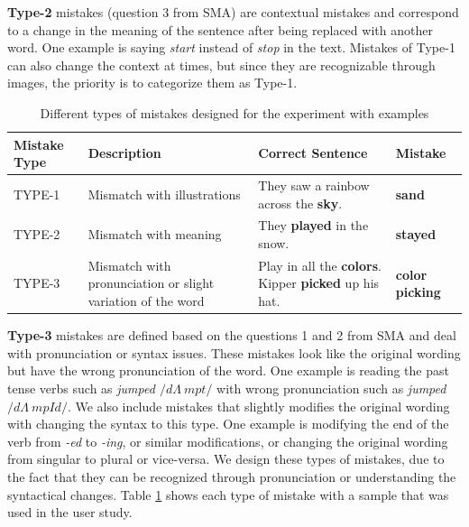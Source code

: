 \documentclass{sigchi}
\begin{document}
\textbf{Type-2} mistakes (question 3 from SMA) are contextual mistakes and correspond to a change in the meaning of the sentence after being replaced with another word.
One example is saying  \textit{start} instead of \textit{stop} in the text. 
Mistakes of Type-1 can also change the context at times, but since they are recognizable through images, the priority is to categorize them as Type-1.

\begin{table}[t]
  \centering
  \footnotesize
  \renewcommand{\arraystretch}{1.8}
  \begin{tabular}{ |p{1.1cm} | p{2.1cm} | p{2.6cm}| p{1.1cm} | }
          \hline
          
          \textbf{Mistake Type} & \textbf{Description} & \textbf{Correct Sentence} & \textbf{Mistake} \\ \hline

          TYPE-1 & Mismatch with illustrations & They saw a rainbow across the \textbf{sky}. & \textbf{sand} \\ \hline 

          TYPE-2 & Mismatch with meaning & They \textbf{played} in the snow. & \textbf{stayed} \\ \hline

          TYPE-3 & Mismatch with pronunciation or slight variation of the word  & Play in all the \textbf{colors}. Kipper \textbf{picked} up his hat. & \textbf{color} \textbf{picking} \\ \hline
          


  \end{tabular}
  \renewcommand{\arraystretch}{1}
  \caption{Different types of mistakes designed for the experiment with examples}
  \label{tab:MistakeTab}
\end{table}


\textbf{Type-3} mistakes are defined based on the questions 1 and 2 from SMA and deal with pronunciation or syntax issues.
These mistakes look like the original wording but have the wrong pronunciation of the word. One example is reading the past tense verbs such as \textit{jumped $/d$\textyogh$\Lambda~mpt/$ }  with wrong pronunciation such as \textit{jumped  $/d$\textyogh$\Lambda~mpId/$}. 
We also include mistakes that slightly modifies the original wording with changing the syntax to this type. 
One example is modifying the end of the verb from \textit{-ed} to \textit{-ing}, or similar modifications, or changing the original wording from singular to plural or vice-versa.
We design these types of mistakes, due to the fact that they can be recognized through pronunciation or understanding the syntactical changes.
Table \ref{tab:MistakeTab} shows each type of mistake with a sample that was used in the user study. 
\end{document}
